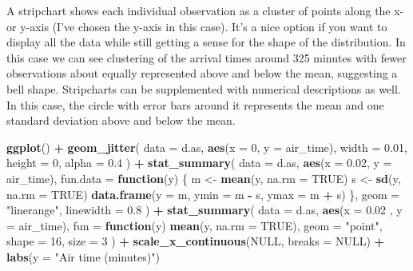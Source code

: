 \documentclass[
]{book}
\newenvironment{Shaded}{\begin{snugshade}}{\end{snugshade}}
\newcommand{\AttributeTok}[1]{\textcolor[rgb]{0.13,0.29,0.53}{#1}}
\newcommand{\ConstantTok}[1]{\textcolor[rgb]{0.56,0.35,0.01}{#1}}
\newcommand{\ControlFlowTok}[1]{\textcolor[rgb]{0.13,0.29,0.53}{\textbf{#1}}}
\newcommand{\DecValTok}[1]{\textcolor[rgb]{0.00,0.00,0.81}{#1}}
\newcommand{\FloatTok}[1]{\textcolor[rgb]{0.00,0.00,0.81}{#1}}
\newcommand{\FunctionTok}[1]{\textcolor[rgb]{0.13,0.29,0.53}{\textbf{#1}}}
\newcommand{\NormalTok}[1]{#1}
\newcommand{\OtherTok}[1]{\textcolor[rgb]{0.56,0.35,0.01}{#1}}
\newcommand{\SpecialCharTok}[1]{\textcolor[rgb]{0.81,0.36,0.00}{\textbf{#1}}}
\newcommand{\StringTok}[1]{\textcolor[rgb]{0.31,0.60,0.02}{#1}}
\begin{document}
A stripchart shows each individual observation as a cluster of points along the x- or y-axis (I've chosen the y-axis in this case). It's a nice option if you want to display all the data while still getting a sense for the shape of the distribution. In this case we can see clustering of the arrival times around 325 minutes with fewer observations about equally represented above and below the mean, suggesting a bell shape. Stripcharts can be supplemented with numerical descriptions as well. In this case, the circle with error bars around it represents the mean and one standard deviation above and below the mean.

\begin{Shaded}
\begin{Highlighting}[]
\FunctionTok{ggplot}\NormalTok{() }\SpecialCharTok{+}
  \FunctionTok{geom\_jitter}\NormalTok{(}
    \AttributeTok{data =}\NormalTok{ d.as,}
    \FunctionTok{aes}\NormalTok{(}\AttributeTok{x =} \DecValTok{0}\NormalTok{, }\AttributeTok{y =}\NormalTok{ air\_time),}
    \AttributeTok{width =} \FloatTok{0.01}\NormalTok{, }\AttributeTok{height =} \DecValTok{0}\NormalTok{, }\AttributeTok{alpha =} \FloatTok{0.4}
\NormalTok{  ) }\SpecialCharTok{+}
  \FunctionTok{stat\_summary}\NormalTok{(}
    \AttributeTok{data =}\NormalTok{ d.as,}
    \FunctionTok{aes}\NormalTok{(}\AttributeTok{x =} \FloatTok{0.02}\NormalTok{, }\AttributeTok{y =}\NormalTok{ air\_time),}
    \AttributeTok{fun.data =} \ControlFlowTok{function}\NormalTok{(y) \{}
\NormalTok{      m }\OtherTok{\textless{}{-}} \FunctionTok{mean}\NormalTok{(y, }\AttributeTok{na.rm =} \ConstantTok{TRUE}\NormalTok{)}
\NormalTok{      s }\OtherTok{\textless{}{-}} \FunctionTok{sd}\NormalTok{(y, }\AttributeTok{na.rm =} \ConstantTok{TRUE}\NormalTok{)}
      \FunctionTok{data.frame}\NormalTok{(}\AttributeTok{y =}\NormalTok{ m, }\AttributeTok{ymin =}\NormalTok{ m }\SpecialCharTok{{-}}\NormalTok{ s, }\AttributeTok{ymax =}\NormalTok{ m }\SpecialCharTok{+}\NormalTok{ s)}
\NormalTok{    \},}
    \AttributeTok{geom =} \StringTok{"linerange"}\NormalTok{,}
    \AttributeTok{linewidth =} \FloatTok{0.8}
\NormalTok{  ) }\SpecialCharTok{+}
  \FunctionTok{stat\_summary}\NormalTok{(}
    \AttributeTok{data =}\NormalTok{ d.as,}
    \FunctionTok{aes}\NormalTok{(}\AttributeTok{x =} \FloatTok{0.02}
\NormalTok{        , }\AttributeTok{y =}\NormalTok{ air\_time),}
    \AttributeTok{fun =} \ControlFlowTok{function}\NormalTok{(y) }\FunctionTok{mean}\NormalTok{(y, }\AttributeTok{na.rm =} \ConstantTok{TRUE}\NormalTok{),}
    \AttributeTok{geom =} \StringTok{"point"}\NormalTok{,}
    \AttributeTok{shape =} \DecValTok{16}\NormalTok{,}
    \AttributeTok{size =} \DecValTok{3}
\NormalTok{  ) }\SpecialCharTok{+}
  \FunctionTok{scale\_x\_continuous}\NormalTok{(}\ConstantTok{NULL}\NormalTok{, }\AttributeTok{breaks =} \ConstantTok{NULL}\NormalTok{) }\SpecialCharTok{+}
  \FunctionTok{labs}\NormalTok{(}\AttributeTok{y =} \StringTok{"Air time (minutes)"}\NormalTok{)}
\end{Highlighting}
\end{Shaded}
\end{document}
